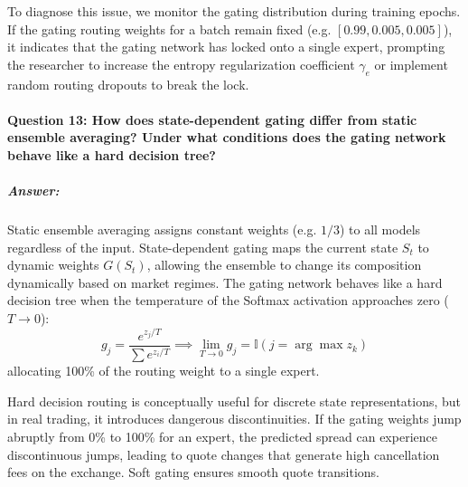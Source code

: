\documentclass[11pt,a4paper]{article}
\begin{document}
To diagnose this issue, we monitor the gating distribution during training epochs. If the gating routing weights for a batch remain fixed (e.g. $[0.99, 0.005, 0.005]$), it indicates that the gating network has locked onto a single expert, prompting the researcher to increase the entropy regularization coefficient $\gamma_e$ or implement random routing dropouts to break the lock.

\paragraph{Question 13: How does state-dependent gating differ from static ensemble averaging? Under what conditions does the gating network behave like a hard decision tree?}
\subparagraph{Answer:}
Static ensemble averaging assigns constant weights (e.g. $1/3$) to all models regardless of the input. State-dependent gating maps the current state $S_t$ to dynamic weights $G(S_t)$, allowing the ensemble to change its composition dynamically based on market regimes.
The gating network behaves like a hard decision tree when the temperature of the Softmax activation approaches zero ($T \to 0$):
\begin{equation}
    g_j = \frac{e^{z_j/T}}{\sum e^{z_i/T}} \implies \lim_{T \to 0} g_j = \mathbb{I}\left(j = \arg\max z_k\right)
\end{equation}
allocating 100\% of the routing weight to a single expert.

Hard decision routing is conceptually useful for discrete state representations, but in real trading, it introduces dangerous discontinuities. If the gating weights jump abruptly from 0\% to 100\% for an expert, the predicted spread can experience discontinuous jumps, leading to quote changes that generate high cancellation fees on the exchange. Soft gating ensures smooth quote transitions.
\end{document}

